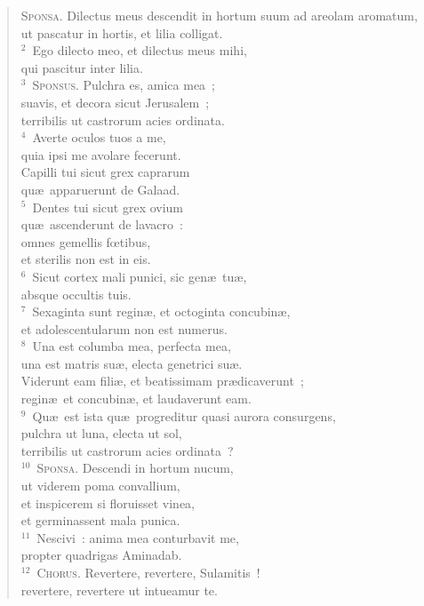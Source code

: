 \begin{flushleft}\begin{verse}\vspace{-19pt}\textsc{Sponsa.} Dilectus meus descendit in hortum suum ad areolam aromatum,\\ ut pascatur in hortis, et lilia colligat.\\
${}^{2}$~Ego dilecto meo, et dilectus meus mihi,\\ qui pascitur inter lilia.\\
${}^{3}$~\textsc{Sponsus.} Pulchra es, amica mea~;\\ suavis, et decora sicut Jerusalem~;\\ terribilis ut castrorum acies ordinata.\\
${}^{4}$~Averte oculos tuos a me,\\ quia ipsi me avolare fecerunt.\\ Capilli tui sicut grex caprarum\\ qu\ae\ apparuerunt de Galaad.\\
${}^{5}$~Dentes tui sicut grex ovium\\ qu\ae\ ascenderunt de lavacro~:\\ omnes gemellis fœtibus,\\ et sterilis non est in eis.\\
${}^{6}$~Sicut cortex mali punici, sic gen\ae\ tu\ae ,\\ absque occultis tuis.\\
${}^{7}$~Sexaginta sunt regin\ae , et octoginta concubin\ae ,\\ et adolescentularum non est numerus.\\
${}^{8}$~Una est columba mea, perfecta mea,\\ una est matris su\ae , electa genetrici su\ae .\\ Viderunt eam fili\ae , et beatissimam pr\ae dicaverunt~;\\ regin\ae\ et concubin\ae , et laudaverunt eam.\\
${}^{9}$~Qu\ae\ est ista qu\ae\ progreditur quasi aurora consurgens,\\ pulchra ut luna, electa ut sol,\\ terribilis ut castrorum acies ordinata~?\\
${}^{10}$~\textsc{Sponsa.} Descendi in hortum nucum,\\ ut viderem poma convallium,\\ et inspicerem si floruisset vinea,\\ et germinassent mala punica.\\
${}^{11}$~Nescivi~: anima mea conturbavit me,\\ propter quadrigas Aminadab.\\
${}^{12}$~\textsc{Chorus.} Revertere, revertere, Sulamitis~!\\ revertere, revertere ut intueamur te.\end{verse}\end{flushleft}


